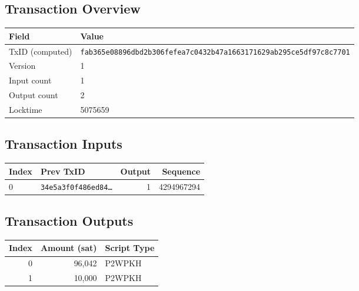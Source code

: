 \subsection*{Transaction Overview}
\begin{tabular}{@{}ll@{}} \toprule
Field & Value \\ \midrule
TxID (computed) & \texttt{fab365e08896dbd2b306fefea7c0432b47a1663171629ab295ce5df97c8c7701} \\
Version & 1 \\
Input count & 1 \\
Output count & 2 \\
Locktime & 5075659 \\
\bottomrule \end{tabular}

\subsection*{Transaction Inputs}
\begin{longtable}{@{}p{2cm}p{5cm}rr@{}} \toprule
Index & Prev TxID & Output & Sequence \\ \midrule
0 & \texttt{34e5a3f0f486ed84…} & 1 & 4294967294 \\
\bottomrule \end{longtable}

\subsection*{Transaction Outputs}
\begin{longtable}{@{}rrl@{}} \toprule
Index & Amount (sat) & Script Type \\ \midrule
0 & 96,042 & P2WPKH \\
1 & 10,000 & P2WPKH \\
\bottomrule \end{longtable}